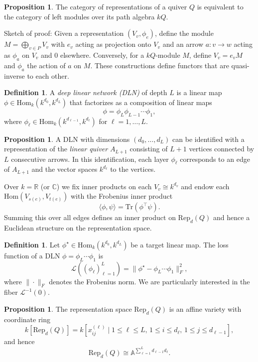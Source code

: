 \documentclass{article}
\theoremstyle{definition}
\newtheorem{proposition}[theorem]{Proposition}
\newtheorem{definition}[theorem]{Definition}
\begin{document}
\begin{proposition}
The category of representations of a quiver $Q$ is equivalent to the category of left modules over its path algebra $kQ$.
\end{proposition}
Sketch of proof: Given a representation $(V_v, \phi_e)$, define the module $M = \bigoplus_{v \in P} V_v$ with $e_v$ acting as projection onto $V_v$ and an arrow $a: v \to w$ acting as $\phi_a$ on $V_v$ and $0$ elsewhere.  
Conversely, for a $kQ$-module $M$, define $V_v = e_v M$ and $\phi_a$ the action of $a$ on $M$.  
These constructions define functors that are quasi-inverse to each other.
\begin{definition}
A \emph{deep linear network (DLN)} of depth $L$ is a linear map $\phi \in \mathrm{Hom}_k(k^{d_0}, k^{d_L})$ that factorizes as a composition of linear maps
\[
    \phi = \phi_L \phi_{L-1} \cdots \phi_1,
\]
where $\phi_\ell \in \mathrm{Hom}_k(k^{d_{\ell-1}}, k^{d_\ell})$ for $\ell = 1, \dots, L$.
\end{definition}

\begin{proposition}
A DLN with dimensions $(d_0, \dots, d_L)$ can be identified with a representation of the \emph{linear quiver} $A_{L+1}$ consisting of $L+1$ vertices connected by $L$ consecutive arrows.  
In this identification, each layer $\phi_\ell$ corresponds to an edge of $A_{L+1}$ and the vector spaces $k^{d_\ell}$ to the vertices.
\end{proposition}

Over $k = \mathbb{R}$ (or $\mathbb{C}$) we fix inner products on each $V_v \cong k^{d_v}$ and endow each $\mathrm{Hom}(V_{s(e)}, V_{t(e)})$ with the Frobenius inner product
\[
    \langle \phi, \psi \rangle = \mathrm{Tr}(\phi^\top \psi).
\]
Summing this over all edges defines an inner product on $\mathrm{Rep}_d(Q)$ and hence a Euclidean structure on the representation space.

\begin{definition}
Let $\phi^\star \in \mathrm{Hom}_k(k^{d_0}, k^{d_L})$ be a target linear map.  
The loss function of a DLN $\phi = \phi_L \cdots \phi_1$ is
\[
    \mathcal{L}((\phi_\ell)_{\ell=1}^L) = \|\phi^\star - \phi_L \cdots \phi_1\|_F^2,
\]
where $\|\cdot\|_F$ denotes the Frobenius norm.  
We are particularly interested in the fiber $\mathcal{L}^{-1}(0)$.
\end{definition}

\begin{proposition}
The representation space $\mathrm{Rep}_d(Q)$ is an affine variety with coordinate ring
\[
    k[\mathrm{Rep}_d(Q)] = k[x_{ij}^{(\ell)} \mid 1 \le \ell \le L,\, 1 \le i \le d_\ell,\, 1 \le j \le d_{\ell-1}],
\]
and hence
\[
    \mathrm{Rep}_d(Q) \cong \mathbb{A}^{\sum_{\ell=1}^L d_{\ell-1} d_\ell}.
\]
\end{proposition}
\end{document}
